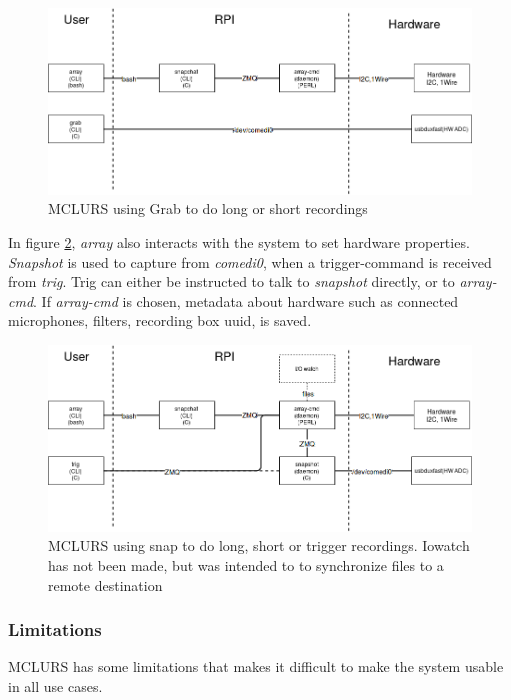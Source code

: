 \begin{figure}[h!]
	\centering
	\includegraphics[width=\textwidth]{figures/mclurs_app1}
	\caption{MCLURS using Grab to do long or short recordings} \label{fig:mclurs:grab}
\end{figure}

In figure \ref{fig:mclurs:snapshot}, \textit{array} also interacts with the system to set hardware properties. \textit{Snapshot} is used to capture from \textit{comedi0}, when a trigger-command is received from \textit{trig}.
Trig can either be instructed to talk to \textit{snapshot} directly, or to \textit{array-cmd}. If \textit{array-cmd} is chosen, metadata about hardware such as connected microphones, filters, recording box uuid, is saved.

\begin{figure}[h!]
	\centering
	\includegraphics[width=\textwidth]{figures/mclurs_app2}
	\caption{MCLURS using snap to do long, short or trigger recordings. Iowatch has not been made, but was intended to to synchronize files to a remote destination} \label{fig:mclurs:snapshot}
\end{figure}

\subsubsection{Limitations} \label{sec:existingsystem:limitations}
MCLURS has some limitations that makes it difficult to make the system usable in all use cases.  \\


